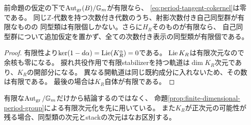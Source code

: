 \begin{corollary}[連続した追加同一視がないための条件]\label{cor:period-no-continuous-drop}
前命題の仮定の下で$\operatorname{Aut}_{\mathrm{gr}}(B)/\mathbb G_m$が有限なら、
\eqref{eq:period-tangent-cokernel}は零である。
同じ$\mathbb Z$-代数を持つ次数付き代数のうち、射影次数付き自己同型群が有限なものの
同型類は有限個しかない。さらに$H_R$そのものが有限なら、
自己同型群について追加仮定を置かず、全ての次数付き表示の同型類が有限個である。
\end{corollary}
\begin{proof}
有限性より$\ker(1-d\alpha)=\operatorname{Lie}(K_R^\alpha)=0$である。
$\operatorname{Lie} K_R$は有限次元なので余核も零になる。
捩れ共役作用で有限stabilizerを持つ軌道は$\dim K_R$次元であり、$K_R$の開部分になる。
異なる開軌道は同じ既約成分に入れないため、その数は有限である。
最後の場合は$K_R$自体が有限である。
\end{proof}

有限な$\operatorname{Aut}_{\mathrm{gr}}/\mathbb G_m$だけから結論するのではなく、
命題\ref{prop:finite-dimensional-period-group}による有限次元化を先に用いている。
また$K_R$が正次元の可能性が残る場合、同型類の次元とstackの次元はなお区別する。

